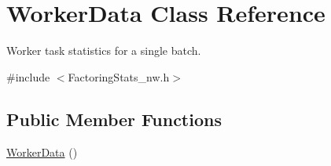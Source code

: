 \hypertarget{class_worker_data}{\section{Worker\-Data Class Reference}
\label{class_worker_data}
}


Worker task statistics for a single batch.  




{\ttfamily \#include $<$Factoring\-Stats\-\_\-nw.\-h$>$}

\subsection*{Public Member Functions}
\begin{DoxyCompactItemize}
\item 
\hypertarget{class_worker_data_a4acd585cf229475a925d7ca233a7716b}{\hyperlink{class_worker_data_a4acd585cf229475a925d7ca233a7716b}{Worker\-Data} ()}\label{class_worker_data_a4acd585cf229475a925d7ca233a7716b}


\end{DoxyCompactItemize}
